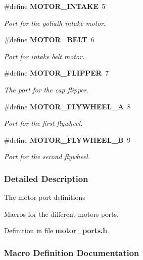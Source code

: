 \begin{DoxyCompactItemize}
\#define \textbf{ M\+O\+T\+O\+R\+\_\+\+I\+N\+T\+A\+KE}~5
\begin{DoxyCompactList}\small\item\em Port for the goliath intake motor. \end{DoxyCompactList}\item 
\#define \textbf{ M\+O\+T\+O\+R\+\_\+\+B\+E\+LT}~6
\begin{DoxyCompactList}\small\item\em Port for intake belt motor. \end{DoxyCompactList}\item 
\#define \textbf{ M\+O\+T\+O\+R\+\_\+\+F\+L\+I\+P\+P\+ER}~7
\begin{DoxyCompactList}\small\item\em The port for the cap flipper. \end{DoxyCompactList}\item 
\#define \textbf{ M\+O\+T\+O\+R\+\_\+\+F\+L\+Y\+W\+H\+E\+E\+L\+\_\+A}~8
\begin{DoxyCompactList}\small\item\em Port for the first flywheel. \end{DoxyCompactList}\item 
\#define \textbf{ M\+O\+T\+O\+R\+\_\+\+F\+L\+Y\+W\+H\+E\+E\+L\+\_\+B}~9
\begin{DoxyCompactList}\small\item\em Port for the second flywheel. \end{DoxyCompactList}\end{DoxyCompactItemize}


\subsubsection{Detailed Description}
The motor port definitions

Macros for the different motors ports. 



Definition in file \textbf{ motor\+\_\+ports.\+h}.



\subsubsection{Macro Definition Documentation}
\mbox{\label{motor__ports_8h_ac2cd96d53dd3ba6407db6766c3d92b26}} 
